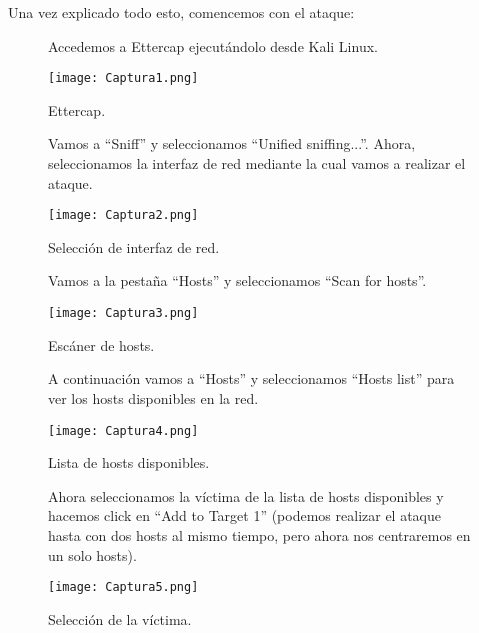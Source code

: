 \documentclass[12pt,letterpaper]{article}
\begin{document}
Una vez explicado todo esto, comencemos con el ataque:
\newpage
\begin{enumerate}
\begin{figure}
\item Accedemos a Ettercap ejecutándolo desde Kali Linux.
	\begin{center}
		\texttt{[image: Captura1.png]}
		\caption{Ettercap.}
		\label{fig: Ettercap}
	\end{center}
\end{figure}

\begin{figure}
	\item Vamos a ``Sniff'' y seleccionamos ``Unified sniffing...''. Ahora, seleccionamos la interfaz de red mediante la cual vamos a realizar el ataque.
	\begin{center}
		\texttt{[image: Captura2.png]}
		\caption{Selección de interfaz de red.}
		\label{fig: Selección de interfaz de red}
	\end{center}
\end{figure}

\begin{figure}
	\item Vamos a la pestaña ``Hosts'' y seleccionamos ``Scan for hosts''.
	\begin{center}
		\texttt{[image: Captura3.png]}
		\caption{Escáner de hosts.}
		\label{fig: Escáner de hosts}
	\end{center}
\end{figure}

\begin{figure}
	\item A continuación vamos a ``Hosts'' y seleccionamos ``Hosts list'' para ver los hosts disponibles en la red.
	\begin{center}
		\texttt{[image: Captura4.png]}
		\caption{Lista de hosts disponibles.}
		\label{fig: Lista de hosts disponibles}
	\end{center}
\end{figure}

\begin{figure}
	\item Ahora seleccionamos la víctima de la lista de hosts disponibles y hacemos click en ``Add to Target 1'' (podemos realizar el ataque hasta con dos hosts al mismo tiempo, pero ahora nos centraremos en un solo hosts).
	\begin{center}
		\texttt{[image: Captura5.png]}
		\caption{Selección de la víctima.}
		\label{fig: Selección de la víctima}
	\end{center}
\end{figure}


\end{enumerate}
\end{document}
